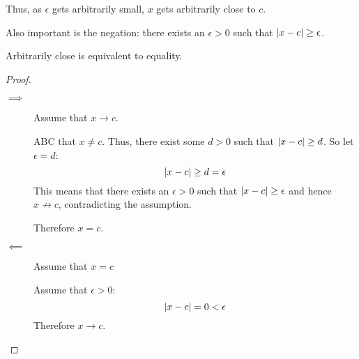 \documentclass[letterpaper,12pt,fleqn]{article}
\newcommand{\e}{\epsilon}
\begin{document}
Thus, as \(\e\) gets arbitrarily small, \(x\) gets arbitrarily close to \(c\).

Also important is the negation: there exists an \(\e>0\) such that \(\abs{x-c}\ge\e\).

\bigskip

\begin{center}
\end{center}

\begin{theorem}
  Arbitrarily close is equivalent to equality.
\end{theorem}

\begin{proof}
  \begin{description}
    \item[]
    \item[\(\implies\)] Assume that \(x\to c\).

      ABC that \(x\ne c\).  Thus, there exist some \(d>0\) such that \(\lvert x-c\rvert\ge d\).  So let \(\e=d\):
      \[\abs{x-c}\ge d=\e\]
      This means that there exists an \(\e>0\) such that \(\abs{x-c}\ge\e\) and hence \(x\not\to c\), contradicting
      the assumption.

      Therefore \(x=c\).

    \item[\(\impliedby\)] Assume that \(x=c\)

      Assume that \(\e>0\):
      \[\abs{x-c}=0<\e\]
      Therefore \(x\to c\).
  \end{description}
\end{proof}
\end{document}
